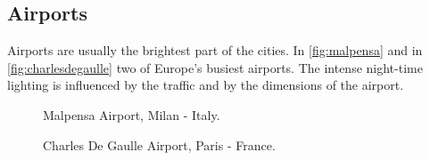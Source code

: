 \subsection{Airports}
Airports are usually the brightest part of the cities. In \autoref{fig:malpensa} and in \autoref{fig:charlesdegaulle} two of Europe's busiest airports. The intense night-time lighting is influenced by the traffic and by the dimensions of the airport.
\begin{figure}[h!]
    \hspace*{-2.8cm}
    \centering
    \caption{Malpensa Airport, Milan - Italy.}%
    \label{fig:malpensa}
\end{figure}
\begin{figure}[h!]
    \hspace*{-2.8cm}
    \centering
    \caption{Charles De Gaulle Airport, Paris - France.}%
    \label{fig:charlesdegaulle}
\end{figure}
